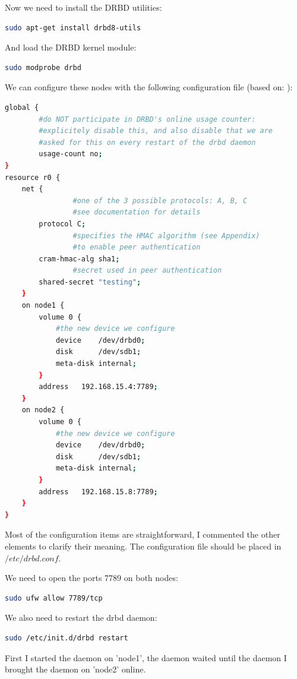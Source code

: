 \documentclass[12pt]{report}
\begin{document}
Now we need to install the DRBD utilities:
\begin{lstlisting}[language=bash]
sudo apt-get install drbd8-utils
\end{lstlisting}
And load the DRBD kernel module:
\begin{lstlisting}[language=bash]
sudo modprobe drbd
\end{lstlisting}

We can configure these nodes with the following configuration file
(based on: \cite{drbd_ubuntu_doc} \cite{drbd_official_doc}):
\begin{lstlisting}[language=bash]
global {
       	#do NOT participate in DRBD's online usage counter:
       	#explicitely disable this, and also disable that we are
       	#asked for this on every restart of the drbd daemon
       	usage-count no;
}
resource r0 {
	net {
                #one of the 3 possible protocols: A, B, C
                #see documentation for details
		protocol C;
                #specifies the HMAC algorithm (see Appendix)
                #to enable peer authentication
		cram-hmac-alg sha1;
                #secret used in peer authentication
		shared-secret "testing";
	}
	on node1 {
		volume 0 {
			#the new device we configure
			device    /dev/drbd0;
			disk      /dev/sdb1;
			meta-disk internal;
		}
		address   192.168.15.4:7789;
	}
	on node2 {
		volume 0 {
			#the new device we configure
			device    /dev/drbd0;
			disk      /dev/sdb1;
			meta-disk internal;
		}
		address   192.168.15.8:7789;
	}
}
\end{lstlisting}
Most of the configuration items are straightforward, I commented the
other elements to clarify their meaning.
The configuration file should be placed in $/etc/drbd.conf$.

We need to open the ports 7789 on both nodes:
\begin{lstlisting}[language=bash]
sudo ufw allow 7789/tcp
\end{lstlisting}

We also need to restart the drbd daemon: 
\begin{lstlisting}[language=bash]
sudo /etc/init.d/drbd restart
\end{lstlisting}

First I started the daemon on 'node1', the daemon waited until the
daemon I brought the daemon on 'node2' online.
\end{document}
